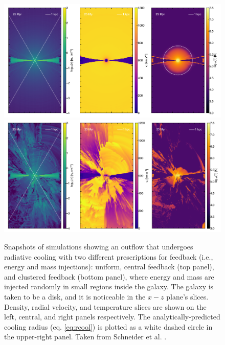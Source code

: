 \begin{figure}
    \centering
    \includegraphics[width=1.0\textwidth]{plots/schneider_uniform.PNG}
    \includegraphics[width=1.0\textwidth]{plots/schneider_cluster.PNG}
    \caption{Snapshots of simulations showing an outflow that undergoes radiative cooling with two different prescriptions for feedback (i.e., energy and mass injections): uniform, central feedback (top panel), and clustered feedback (bottom panel), where energy and mass are injected randomly in small regions inside the galaxy. The galaxy is taken to be a disk, and it is noticeable in the $x - z$ plane's slices. Density, radial velocity, and temperature slices are shown on the left, central, and right panels respectively. The analytically-predicted cooling radius (eq. \ref{eq:rcool}) is plotted as a white dashed circle in the upper-right panel. Taken from Schneider et al. \citep{schneider2018production}.
    }
    \label{fig:thompson_simulation}
\end{figure}


